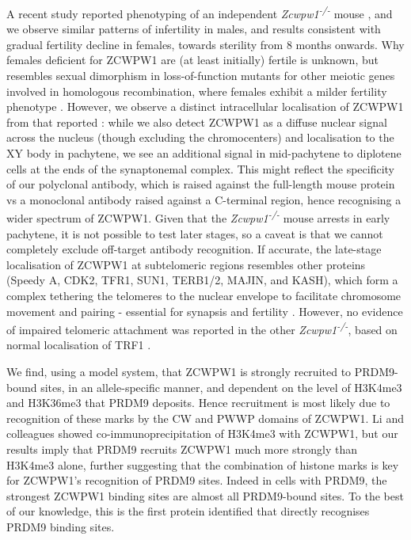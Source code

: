 A recent study reported phenotyping of an independent \textit{Zcwpw1\textsuperscript{-/-}} mouse \parencite{Li2019histone}, and we observe similar patterns of infertility in males, and results consistent with gradual fertility decline in females, towards sterility from 8 months onwards. Why females deficient for ZCWPW1 are (at least initially) fertile is unknown, but resembles sexual dimorphism in loss-of-function mutants for other meiotic genes involved in homologous recombination, where females exhibit a milder fertility phenotype \parencite{Cahoon2019Leagues, Morelli2005Not, Zhang2019meiosisspecific}. However, we observe a distinct intracellular localisation of ZCWPW1 from that reported \parencite{Li2019histone}: while we also detect ZCWPW1 as a diffuse nuclear signal across the nucleus (though excluding the chromocenters) and localisation to the XY body in pachytene, we see an additional signal in mid-pachytene to diplotene cells at the ends of the synaptonemal complex. This might reflect the specificity of our polyclonal antibody, which is raised against the full-length mouse protein vs a monoclonal antibody raised against a C-terminal region, hence recognising a wider spectrum of ZCWPW1. Given that the \textit{Zcwpw1\textsuperscript{-/-}} mouse arrests in early pachytene, it is not possible to test later stages, so a caveat is that we cannot completely exclude off-target antibody recognition. If accurate, the late-stage localisation of ZCWPW1 at subtelomeric regions resembles other proteins (Speedy A, CDK2, TFR1, SUN1, TERB1/2, MAJIN, and KASH), which form a complex tethering the telomeres to the nuclear envelope to facilitate chromosome movement and pairing - essential for synapsis and fertility \parencite{Ashley2001Localization, Ding2007SUN1, Horn2013mammalian, Shibuya2014TRF1binding, Tu2017Speedy}. However, no evidence of impaired telomeric attachment was reported in the other \textit{Zcwpw1\textsuperscript{-/-}}, based on normal localisation of TRF1 \parencite{Li2019histone}.

We find, using a model system, that ZCWPW1 is strongly recruited to PRDM9-bound sites, in an allele-specific manner, and dependent on the level of H3K4me3 and H3K36me3 that PRDM9 deposits. Hence recruitment is most likely due to recognition of these marks by the CW and PWWP domains of ZCWPW1. Li and colleagues \parencite{Li2019histone} showed co-immunoprecipitation of H3K4me3 with ZCWPW1, but our results imply that PRDM9 recruits ZCWPW1 much more strongly than H3K4me3 alone, further suggesting that the combination of histone marks is key for ZCWPW1's recognition of PRDM9 sites. Indeed in cells with PRDM9, the strongest ZCWPW1 binding sites are almost all PRDM9-bound sites. To the best of our knowledge, this is the first protein identified that directly recognises PRDM9 binding sites.

